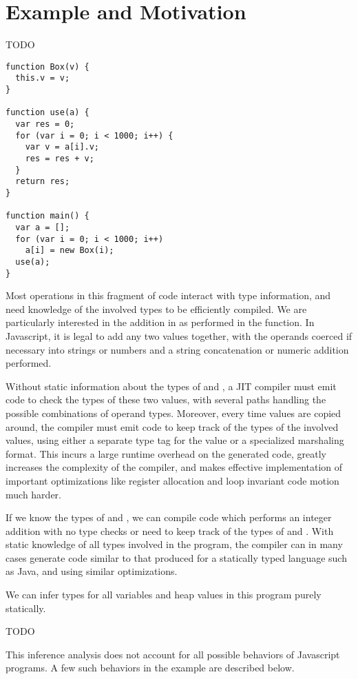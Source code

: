
\section{Example and Motivation}

TODO

\begin{verbatim}
function Box(v) {
  this.v = v;
}

function use(a) {
  var res = 0;
  for (var i = 0; i < 1000; i++) {
    var v = a[i].v;
    res = res + v;
  }
  return res;
}

function main() {
  var a = [];
  for (var i = 0; i < 1000; i++)
    a[i] = new Box(i);
  use(a);
}
\end{verbatim}

Most operations in this fragment of code interact with type information,
and need knowledge of the involved types to be efficiently compiled.
We are particularly interested in the addition in
 as performed in the  function.
In Javascript, it is legal to add any two values together, with the
operands coerced if necessary into strings or numbers and a string
concatenation or numeric addition performed.

Without static information about the types of  and ,
a JIT compiler must emit code to check the types of these two values,
with several paths handling the possible combinations of
operand types.
Moreover, every time values are copied around, the compiler must emit
code to keep track of the types of the involved values, using either
a separate type tag for the value or a specialized marshaling format.
This incurs a large runtime overhead on the generated code,
greatly increases the complexity of the compiler,
and makes effective implementation of important optimizations like
register allocation and loop invariant code motion much harder.

If we know the types of  and , we can compile
code which performs an integer addition with no type checks or need
to keep track of the types of  and .
With static knowledge of all types involved in the program, the compiler can
in many cases generate code similar to that produced for a statically
typed language such as Java, and using similar optimizations.

We can infer types for all variables and heap values in this program
purely statically.

TODO

This inference analysis does not account for all possible behaviors
of Javascript programs.
A few such behaviors in the example are described below.

